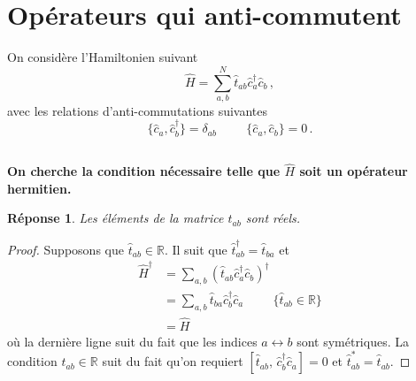\documentclass{article}
\numberwithin{equation}{section}
\theoremstyle{solution}
\newtheorem{solution}{Réponse}[section]
\begin{document}
        

\section{Opérateurs qui anti-commutent}
On considère l'Hamiltonien suivant
\begin{equation}\label{eq:hamiltonien5}
       \hat{H} = \sum_{a, b}^{N} \hat{t}_{ab}\hat{c}^{\dagger}_a \hat{c}_b \, ,
\end{equation} 
avec les relations d'anti-commutations suivantes
\begin{equation}\label{eq:commut5}
        \{\hat{c}_a, \hat{c}^{\dagger}_b \} = \delta_{ab} \hspace{1cm} \{ \hat{c}_a, \hat{c}_b\} = 0\, .
\end{equation} 

\subsection{}
\textbf{On cherche la condition nécessaire telle que $\hat{H}$ soit un opérateur hermitien.}
\begin{solution}
        Les éléments de la matrice $t_{ab}$ sont réels.
\end{solution}
\begin{proof}
Supposons que $\hat{t}_{ab} \in \mathbb{R}$. Il suit que $\hat{t}^{\dagger}_{ab} = \hat{t}_{ba}$ et
\begin{align*}
       \hat{H}^{\dagger} &=  \sum_{a,b}(\hat{t}_{ab}\hat{c}^{\dagger}_a \hat{c}_b)^{\dagger} \\
                         &= \sum_{a,b} \hat{t}_{ba} \hat{c}^{\dagger}_b \hat{c}_a \hspace{1cm} \{\hat{t}_{ab} \in \mathbb{R}\}\\
                         &= \hat{H}
\end{align*} 
où la dernière ligne suit du fait que les indices $a \leftrightarrow b$ sont symétriques.
La condition $\hat{t}_{ab} \in \mathbb{R}$ suit du fait qu'on requiert $[\hat{t}_{ab},\, \hat{c}^{\dagger}_b \hat{c}_a] = 0$ et $\hat{t}_{ab}^{*} = \hat{t}_{ab}$.
\end{proof}
\end{document}
